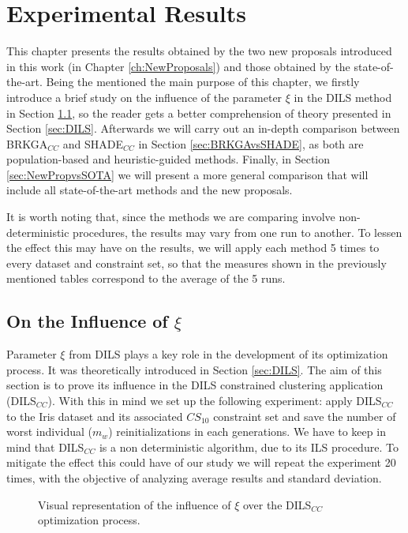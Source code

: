 \chapter{Experimental Results} \label{ch:ExperimentalResults}

This chapter presents the results obtained by the two new proposals introduced in this work (in Chapter \ref{ch:NewProposals}) and those obtained by the state-of-the-art. Being the mentioned the main purpose of this chapter, we firstly introduce a brief study on the influence of the parameter $\xi$ in the \acs{DILS} method in Section \ref{sec:XiInfl}, so the reader gets a better comprehension of theory presented in Section \ref{sec:DILS}. Afterwards we will carry out an in-depth comparison between \acs{BRKGA}$_{CC}$ and \acs{SHADE}$_{CC}$ in Section \ref{sec:BRKGAvsSHADE}, as both are population-based and heuristic-guided methods. Finally, in Section \ref{sec:NewPropvsSOTA}  we will present a more general comparison that will include all state-of-the-art methods and the new proposals.

It is worth noting that, since the methods we are comparing involve non-deterministic procedures, the results may vary from one run to another. To lessen the effect this may have on the results, we will apply each method 5 times to every dataset and constraint set, so that the measures shown in the previously mentioned tables correspond to the average of the 5 runs.

\section{On the Influence of $\xi$} \label{sec:XiInfl}

Parameter $\xi$ from \acs{DILS} plays a key role in the development of its optimization process. It was theoretically introduced in Section \ref{sec:DILS}. The aim of this section is to prove its influence in the \acs{DILS} constrained clustering application (\acs{DILS}$_{CC}$). With this in mind we set up the following experiment: apply \acs{DILS}$_{CC}$ to the Iris dataset and its associated $CS_{10}$ constraint set and save the number of worst individual ($m_w$) reinitializations in each generations. We have to keep in mind that \acs{DILS}$_{CC}$ is a non deterministic algorithm, due to its \acf{ILS} procedure. To mitigate the effect this could have of our study we will repeat the experiment 20 times, with the objective of analyzing average results and standard deviation.

\begin{figure}[bth]
	\myfloatalign
	\hspace{1cm}
	\caption[Visual representation of the influence of $\xi$ over the DILS$_{CC}$ optimization process.]{Visual representation of the influence of $\xi$ over the \acs{DILS}$_{CC}$ optimization process.}
	\label{fig:RestartsLines}
\end{figure}

